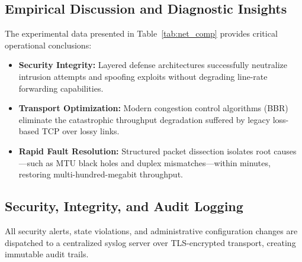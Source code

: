 \subsection{Empirical Discussion and Diagnostic Insights}
The experimental data presented in Table~\ref{tab:net_comp} provides critical operational conclusions:
\begin{itemize}
  \item \textbf{Security Integrity:} Layered defense architectures successfully neutralize intrusion attempts and spoofing exploits without degrading line-rate forwarding capabilities.
  \item \textbf{Transport Optimization:} Modern congestion control algorithms (BBR) eliminate the catastrophic throughput degradation suffered by legacy loss-based TCP over lossy links.
  \item \textbf{Rapid Fault Resolution:} Structured packet dissection isolates root causes---such as MTU black holes and duplex mismatches---within minutes, restoring multi-hundred-megabit throughput.
\end{itemize}

\subsection{Security, Integrity, and Audit Logging}
All security alerts, state violations, and administrative configuration changes are dispatched to a centralized syslog server over TLS-encrypted transport, creating immutable audit trails.
